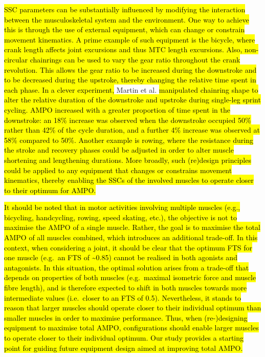 \documentclass[
  10pt,
  letterpaper,
]{article}
\begin{document}
\hl{SSC parameters can be substantially influenced by modifying the
interaction between the musculoskeletal system and the environment. One
way to achieve this is through the use of external equipment, which can
change or constrain movement kinematics. A prime example of such
equipment is the bicycle, where crank length affects joint excursions
and thus MTC length excursions. Also, non-circular chainrings can be
used to vary the gear ratio throughout the crank revolution. This allows
the gear ratio to be increased during the downstroke and to be decreased
during the upstroke, thereby changing the relative time spent in each
phase. In a clever experiment,} {Martin et al.
\citep{martin_pedal_2002}} \hl{manipulated chainring shape to alter the
relative duration of the downstroke and upstroke during single-leg
sprint cycling. AMPO increased with a greater proportion of time spent
in the downstroke: an 18\% increase was observed when the downstroke
occupied 50\% rather than 42\% of the cycle duration, and a further 4\%
increase was observed at 58\% compared to 50\%. Another example is
rowing, where the resistance during the stroke and recovery phases could
be adjusted in order to alter muscle shortening and lengthening
durations. More broadly, such (re)design principles could be applied to
any equipment that changes or constrains movement kinematics, thereby
enabling the SSCs of the involved muscles to operate closer to their
optimum for AMPO.}

\hl{It should be noted that in motor activities involving multiple
muscles (e.g., bicycling, handcycling, rowing, speed skating, etc.), the
objective is not to maximise the AMPO of a single muscle. Rather, the
goal is to maximise the total AMPO of all muscles combined, which
introduces an additional trade-off. In this context, when considering a
joint, it should be clear that the optimum FTS for one muscle (e.g.~an
FTS of \textasciitilde0.85) cannot be realised in both agonists and
antagonists. In this situation, the optimal solution arises from a
trade-off that depends on properties of both muscles (e.g.~maximal
isometric force and muscle fibre length), and is therefore expected to
shift in both muscles towards more intermediate values (i.e.~closer to
an FTS of 0.5). Nevertheless, it stands to reason that larger muscles
should operate closer to their individual optimum than smaller muscles
in order to maximise performance. Thus, when (re-)designing equipment to
maximise total AMPO, configurations should enable larger muscles to
operate closer to their individual optimum. Our study provides a
starting point for guiding future equipment design aimed at improving
total AMPO.}
\end{document}

